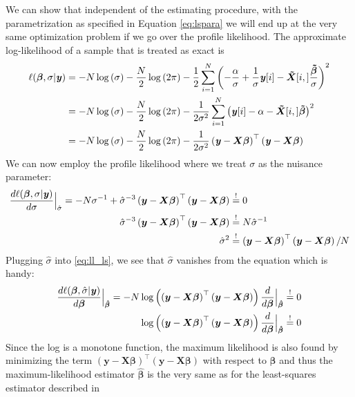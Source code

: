 \documentclass[11pt,a4paper,twoside]{book}\usepackage[]{graphicx}\usepackage[]{xcolor}
\begin{document}
We can show that independent of the estimating procedure, with the parametrization as specified in Equation \eqref{eq:lspara} we will end up at the very same optimization problem if we go over the profile likelihood.
The approximate log-likelihood of a sample that is treated as exact is
\begin{align}
\ell(\boldsymbol{\beta},\sigma|{\textbf{\textit{y}}})&=-N\log\left(\sigma\right)-\frac{N}{2}\log\left(2\pi\right)-\frac{1}{2}\sum_{i=1}^N\left(-\frac{\alpha}{\sigma}+\frac{1}{\sigma} {\textbf{\textit{y}}}[i]-\boldsymbol{\tilde{X}}[i,]\frac{\boldsymbol{\tilde\beta}}{\sigma}\right)^2 \nonumber\\
&=-N\log\left(\sigma\right)-\frac{N}{2}\log\left(2\pi\right)-\frac{1}{2\sigma^2}\sum_{i=1}^N\left({\textbf{\textit{y}}}[i]-\alpha-\boldsymbol{\tilde{X}}[i,]\boldsymbol{\tilde\beta}\right)^2 \nonumber\\
&=-N\log\left(\sigma\right)-\frac{N}{2}\log\left(2\pi\right)-\frac{1}{2\sigma^2}\left({\textbf{\textit{y}}}-{\boldsymbol{X}}{\boldsymbol{\beta}}\right)^\top\left({\textbf{\textit{y}}}-{\boldsymbol{X}}{\boldsymbol{\beta}}\right) \label{eq:ll_ls}
\end{align}
We can now employ the profile likelihood where we treat $\sigma$ as the nuisance parameter:
\begin{align*}
\frac{d\ell(\boldsymbol{\beta},\sigma|\y)}{d\sigma}\Big|_{\hat\sigma}=-N\sigma^{-1}+\hat\sigma^{-3}\left(\boldsymbol{y}-\boldsymbol{X\beta}\right)^\top\left(\boldsymbol{y}-\boldsymbol{X\beta}\right)&\stackrel{!}{=}0 \\
\hat\sigma^{-3}\left(\boldsymbol{y}-\boldsymbol{X\beta}\right)^\top\left(\boldsymbol{y}-\boldsymbol{X\beta}\right)&\stackrel{!}{=}N\hat\sigma^{-1}\\
\hat\sigma^2&\stackrel{!}{=}\left(\boldsymbol{y}-\boldsymbol{X\beta}\right)^\top\left(\boldsymbol{y}-\boldsymbol{X\beta}\right)/N
\end{align*}
Plugging $\hat\sigma$ into \eqref{eq:ll_ls}, we see that $\hat\sigma$ vanishes from the equation which is handy:
\begin{align*}
\frac{d\ell(\boldsymbol{\beta},\hat\sigma|\y)}{d\boldsymbol{\beta}}\Big|_{\hbbeta}=-N\log\left(\left(\boldsymbol{y}-\boldsymbol{X\beta}\right)^\top\left(\boldsymbol{y}-\boldsymbol{X\beta}\right)\right)\frac{d}{d\boldsymbol{\beta}}\Big|_{\hbbeta}&\stackrel{!}{=}0\\
\log\left(\left(\boldsymbol{y}-\boldsymbol{X\beta}\right)^\top\left(\boldsymbol{y}-\boldsymbol{X\beta}\right)\right)\frac{d}{d\boldsymbol{\beta}}\Big|_{\hbbeta}&\stackrel{!}{=}0
\end{align*}
Since the log is a monotone function, the maximum likelihood is also found by minimizing the term $\left(\boldsymbol{y}-\boldsymbol{X\beta}\right)^\top\left(\boldsymbol{y}-\boldsymbol{X\beta}\right)$ with respect to $\boldsymbol{\beta}$ and thus the maximum-likelihood estimator $\boldsymbol{\hat\beta}$ is the very same as for the least-squares estimator described in
\end{document}
